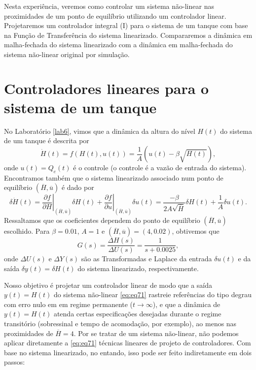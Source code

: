 \documentclass[
]{book}
\theoremstyle{definition}
\theoremstyle{definition}
\theoremstyle{definition}
\theoremstyle{remark}
\begin{document}
Nesta experiência, veremos como controlar um sistema não-linear nas proximidades de um ponto de equilíbrio utilizando um controlador linear. Projetaremos um controlador integral (I) para o sistema de um tanque com base na Função de Transferência do sistema linearizado. Compararemos a dinâmica em malha-fechada do sistema linearizado com a dinâmica em malha-fechada do sistema não-linear original por simulação.

\hypertarget{controladores-lineares-para-o-sistema-de-um-tanque}{%
\section{Controladores lineares para o sistema de um tanque}\label{controladores-lineares-para-o-sistema-de-um-tanque}}

No Laboratório \ref{lab6}, vimos que a dinâmica da altura do nível \(H(t)\) do sistema de um tanque é descrita por
\[
\dot{H}(t) = f(H(t),u(t)) = \frac{1}{A}(u(t)-\beta\sqrt{H(t)}), \label{eq:eq71}
\]
onde \(u(t) = Q_e(t)\) é o controle (o controle é a vazão de entrada do sistema). Encontramos também que o sistema linearizado associado num ponto de equilíbrio \((\overline{H}, \overline{u})\) é dado por
\[
\delta\dot{H}(t) = \left.\frac{\partial f}{\partial H}\right|_{(\overline{H}, \overline{u})}\delta H(t) + \left.\frac{\partial f}{\partial u}\right|_{(\overline{H}, \overline{u})}\delta u(t) = \boxed{\frac{- \beta}{2A\sqrt{\overline{H}}}\delta H(t) + \frac{1}{A}\delta u(t)}.  \label{eq:eq72}
\]
Ressaltamos que os coeficientes dependem do ponto de equilíbrio \((\overline{H}, \overline{u})\) escolhido. Para \(\beta = 0.01\), \(A = 1\) e \((\overline{H}, \overline{u}) = (4, 0.02)\), obtivemos que
\[
G(s) = \frac{\Delta H(s)}{\Delta U(s)} = \frac{1}{s + 0.0025}, \label{eq:eq73}
\]
onde \(\Delta U(s)\) e \(\Delta Y(s)\) são as Transformadas e Laplace da entrada \(\delta u(t)\) e da saída \(\delta y(t) = \delta H(t)\) do sistema linearizado, respectivamente.

Nosso objetivo é projetar um controlador linear de modo que a saída \(y(t) = H(t)\) do sistema não-linear \eqref{eq:eq71} rastreie referências do tipo degrau com erro nulo em em regime permanente (\(t\to\infty\)), e que a dinâmica de \(y(t) = H(t)\) atenda certas especificações desejadas durante o regime transitório (sobressinal e tempo de acomodação, por exemplo), ao menos nas proximidades de \(\overline{H} = 4\). Por se tratar de um sistema não-linear, não podemos aplicar diretamente a \eqref{eq:eq71} técnicas lineares de projeto de controladores. Com base no sistema linearizado, no entando, isso pode ser feito indiretamente em dois passos:
\end{document}
